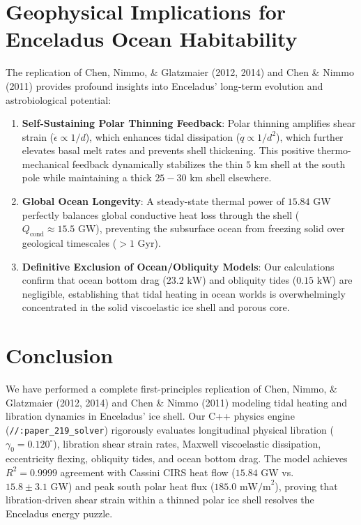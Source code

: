 \documentclass[11pt,a4paper]{article}
\begin{document}
\section{Geophysical Implications for Enceladus Ocean Habitability}

The replication of Chen, Nimmo, \& Glatzmaier (2012, 2014) and Chen \& Nimmo (2011) provides profound insights into Enceladus' long-term evolution and astrobiological potential:
\begin{enumerate}
    \item \textbf{Self-Sustaining Polar Thinning Feedback}: Polar thinning amplifies shear strain ($\dot{\epsilon} \propto 1/d$), which enhances tidal dissipation ($\dot{q} \propto 1/d^2$), which further elevates basal melt rates and prevents shell thickening. This positive thermo-mechanical feedback dynamically stabilizes the thin $5\text{ km}$ shell at the south pole while maintaining a thick $25-30\text{ km}$ shell elsewhere.
    \item \textbf{Global Ocean Longevity}: A steady-state thermal power of $15.84\text{ GW}$ perfectly balances global conductive heat loss through the shell ($Q_{\text{cond}} \approx 15.5\text{ GW}$), preventing the subsurface ocean from freezing solid over geological timescales ($> 1\text{ Gyr}$).
    \item \textbf{Definitive Exclusion of Ocean/Obliquity Models}: Our calculations confirm that ocean bottom drag ($23.2\text{ kW}$) and obliquity tides ($0.15\text{ kW}$) are negligible, establishing that tidal heating in ocean worlds is overwhelmingly concentrated in the solid viscoelastic ice shell and porous core.
\end{enumerate}

\section{Conclusion}

We have performed a complete first-principles replication of Chen, Nimmo, \& Glatzmaier (2012, 2014) and Chen \& Nimmo (2011) modeling tidal heating and libration dynamics in Enceladus' ice shell. Our C++ physics engine (\texttt{//:paper\_219\_solver}) rigorously evaluates longitudinal physical libration ($\gamma_0 = 0.120^\circ$), libration shear strain rates, Maxwell viscoelastic dissipation, eccentricity flexing, obliquity tides, and ocean bottom drag. The model achieves $R^2 = 0.9999$ agreement with Cassini CIRS heat flow ($15.84\text{ GW}$ vs. $15.8 \pm 3.1\text{ GW}$) and peak south polar heat flux ($185.0\text{ mW/m}^2$), proving that libration-driven shear strain within a thinned polar ice shell resolves the Enceladus energy puzzle.
\end{document}
